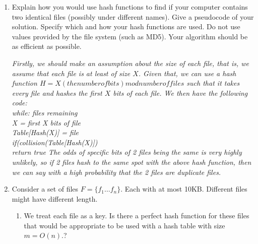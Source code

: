 \documentclass[11pt,epic,leqno,eepic,psfig,]{article}
\newcommand{\ans}[1]{{\color{brown}{\bf\Large Answer:} \sl  #1 \color{black}}}
\renewcommand{\i}{\item}
\begin{document}
\renewcommand{\i}{\item}

 
 \everymath{\color{blue}}
 

\def\polylog{{{\sl polylog }}}
\def\poly{{{\sl poly }}}





\newpage 






   
\begin{enumerate}


 
 \item Explain how you would use hash functions to find if your computer  contains two identical  files  (possibly under different names).   Give a     pseudocode of your solution.    Specify which and how your hash functions are used. Do not use  values provided by the file system (such as MD5). Your algorithm should be as efficient as possible.
 
 \ans{Firstly, we should make an assumption about the size of each file, that is, we assume that each file is at least of size $X$. Given that, we can use a hash function $H = X(the number of bits) mod number of files$ such that it takes every file and hashes the first $X$ bits of each file. We then have the following code:
 \\ while: files remaining
 \\     X = first X bits of file
 \\     Table[Hash(X)] = file
 \\     if(collision(Table[Hash(X)])
 \\          return true
 The odds of specific bits of 2 files being the same is very highly unlikely, so if 2 files hash to the same spot with the above hash function, then we can say with a high probability that the 2 files are duplicate files.}
 
\i 
 Consider a set of files $F=\{f_1\dots f_n\}$. Each with at most 10KB. Different files might have different length. 

\begin{enumerate}
    \item We treat each file as a key. 
    Is there a perfect hash function for these  files   {\color{purple}  that would be appropriate to be used with a hash table with size $m=O(n)$.?} 
    

\end{enumerate}
\end{enumerate}
\end{document}
